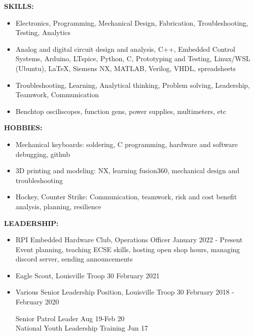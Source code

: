 \documentclass[11pt]{article}
\begin{document}
\textbf{SKILLS:}
\vspace{-0.35cm}
\begin{itemize}
\setlength\itemsep{-.37em}
\item Electronics, Programming, Mechanical Design, Fabrication, Troubleshooting, Testing, Analytics
    \item Analog and digital circuit design and analysis, C++, Embedded Control Systems, Arduino, LTspice, Python, C, Prototyping and Testing, Linux/WSL (Ubuntu), LaTeX, Siemens NX, MATLAB, Verilog, VHDL, spreadsheets 
    \item Troubleshooting, Learning, Analytical thinking, Problem solving, Leadership, Teamwork, Communication
    \item Benchtop osciliscopes, function gens, power supplies, multimeters, etc
\end{itemize}

\textbf{HOBBIES:}
\vspace{-0.35cm}
\begin{itemize}
\setlength\itemsep{-.37em}
    \item Mechanical keyboards: soldering, C programming, hardware and software debugging, github
    \item 3D printing and modeling: NX, learning fusion360, mechanical design and troubleshooting
    \item Hockey, Counter Strike: Communication, teamwork, risk and cost benefit analysis, planning, resilience
\end{itemize}

\textbf{LEADERSHIP:}
\vspace{-0.35cm}
\begin{itemize}
\setlength\itemsep{-.37em}
    \item RPI Embedded Hardware Club, Operations Officer \hfill January 2022 - Present \\ 
    Event planning, teaching ECSE skills, hosting open shop hours, managing discord server, sending announcements
    \item Eagle Scout, Louisville Troop 30 \hfill February 2021
    \item Various Senior Leadership Position, Louisville Troop 30 \hfill February 2018 - February 2020
    \vspace{-0.35cm}
    \begin{addmargin}[1em]{2em}
        \begin{multicols}{2}
        Senior Patrol Leader \hfill Aug 19-Feb 20\\
         National Youth Leadership Training \hfill Jun 17
        \end{multicols}
    \end{addmargin}
\end{itemize}
\end{document}

